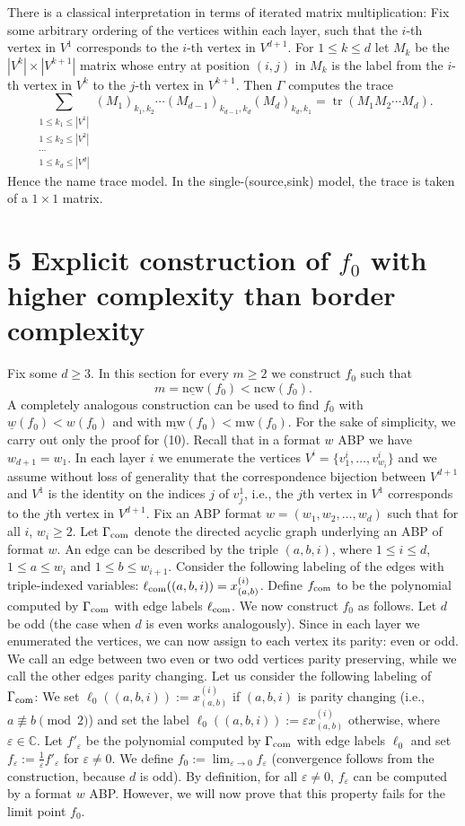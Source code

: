 \documentclass[10pt,a4paper]{article}
\newcommand{\C}{\mathbb C}
\newcommand{\fcom}{f_{\rm com}}
\newcommand{\Gcom}{\Gamma_{\rm com}}
\newcommand{\ncw}{\mathrm{ncw}}
\begin{document}
There is a classical interpretation in terms of iterated matrix multiplication: Fix some arbitrary ordering of the vertices within each layer, such that the $i$-th vertex in $V^1$ corresponds to the $i$-th vertex in $V^{d+1}$. For $1\le k\le d$ let $M_k$ be the $|V^k|\times|V^{k+1}|$ matrix whose entry at position $(i,j)$ in $M_k$ is the label from the $i$-th vertex in $V^k$ to the $j$-th vertex in $V^{k+1}$. Then $\Gamma$ computes the trace
\[\sum_{\substack{1\le k_1\le|V^1|\\1\le k_2\le|V^2|\\\cdots\\1\le k_d\le|V^d|}}(M_1)_{k_1,k_2}\cdots(M_{d-1})_{k_{d-1},k_d}(M_d)_{k_d,k_1}=\operatorname{tr}(M_1M_2\cdots M_d).\tag{8}\]
Hence the name trace model. In the single-(source,sink) model, the trace is taken of a $1\times1$ matrix.
\section*{5 Explicit construction of $f_0$ with higher complexity than border complexity}
Fix some $d\ge3$. In this section for every $m\ge2$ we construct $f_0$ such that
\[m=\underline{\ncw}(f_0)<\ncw(f_0).\tag{10}\]
A completely analogous construction can be used to find $f_0$ with $\underline w(f_0)<w(f_0)$ and with $\underline{\mathrm{mw}}(f_0)<\mathrm{mw}(f_0)$. For the sake of simplicity, we carry out only the proof for (10).
Recall that in a format $w$ ABP we have $w_{d+1}=w_1$. In each layer $i$ we enumerate the vertices $V^i=\{v^i_1,\ldots,v^i_{w_i}\}$ and we assume without loss of generality that the correspondence bijection between $V^{d+1}$ and $V^1$ is the identity on the indices $j$ of $v^1_j$, i.e., the $j$th vertex in $V^1$ corresponds to the $j$th vertex in $V^{d+1}$.
Fix an ABP format $w=(w_1,w_2,\ldots,w_d)$ such that for all $i$, $w_i\ge2$. Let $\Gcom$ denote the directed acyclic graph underlying an ABP of format $w$. An edge can be described by the triple $(a,b,i)$, where $1\le i\le d$, $1\le a\le w_i$ and $1\le b\le w_{i+1}$. Consider the following labeling of the edges with triple-indexed variables: $\ell_{\rm com}((a,b,i))=x^{(i)}_{(a,b)}$. Define $\fcom$ to be the polynomial computed by $\Gcom$ with edge labels $\ell_{\rm com}$.
We now construct $f_0$ as follows. Let $d$ be odd (the case when $d$ is even works analogously). Since in each layer we enumerated the vertices, we can now assign to each vertex its parity: even or odd. We call an edge between two even or two odd vertices parity preserving, while we call the other edges parity changing. Let us consider the following labeling of $\Gcom$: We set $\ell_0((a,b,i)):=x^{(i)}_{(a,b)}$ if $(a,b,i)$ is parity changing (i.e., $a\not\equiv b\pmod2$) and set the label $\ell_0((a,b,i)):=\varepsilon x^{(i)}_{(a,b)}$ otherwise, where $\varepsilon\in\C$. Let $f'_\varepsilon$ be the polynomial computed by $\Gcom$ with edge labels $\ell_0$ and set $f_\varepsilon:=\frac1\varepsilon f'_\varepsilon$ for $\varepsilon\ne0$. We define $f_0:=\lim_{\varepsilon\to0}f_\varepsilon$ (convergence follows from the construction, because $d$ is odd). By definition, for all $\varepsilon\ne0$, $f_\varepsilon$ can be computed by a format $w$ ABP. However, we will now prove that this property fails for the limit point $f_0$.
\setcounter{theorem}{3}
\end{document}

